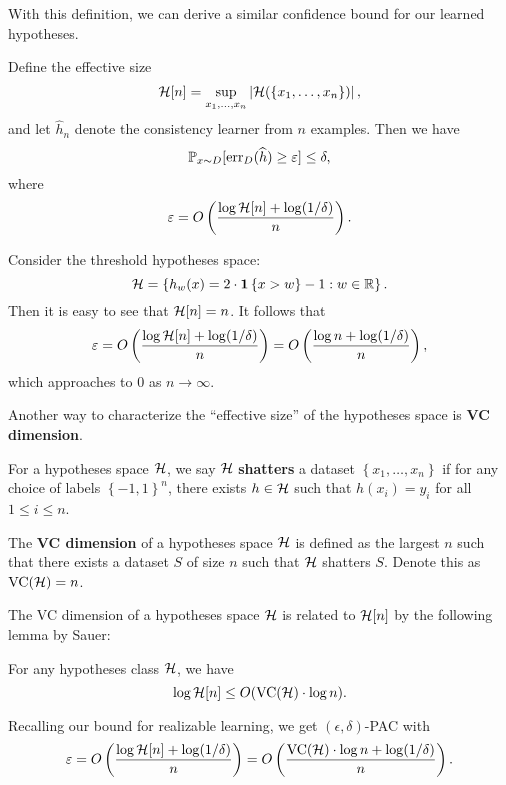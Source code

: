 \documentclass[a4paper]{article}
\begin{document}
With this definition, we can derive a similar confidence
bound for our learned hypotheses.

\begin{thm}
  Define the effective size
  \[
  \mathcal{H} [n] = \sup_{x_1, \dots, x_n}
  \left\lvert \mathcal{H}(\left\{ x_1, \dots, x_n \right\})\right\rvert,
  \]
  and let $\hat{h}_n$ denote the consistency learner
  from $n$ examples. Then we have
  \[
  \mathbb{P}_{x \sim D} [\operatorname{err}_D(\widehat{h}) \geq \varepsilon] \leq \delta,
  \]
  where
  \[
  \varepsilon = O \left(
    \frac{\log \mathcal{H}[n] + \log (1 / \delta)}{n}
   \right).
  \]
\end{thm}

\begin{eg}
  Consider the threshold hypotheses space:
  \[
  \mathcal{H} = \left\{ h_w(x) = 2 \cdot
  \mathbf{1} \left\{ x > w \right\} - 1 : w \in \mathbb{R} \right\}.
  \]
  Then it is easy to see that $\mathcal{H}[n] = n$.
  It follows that
  \[
  \varepsilon = O\left(
    \frac{\log \mathcal{H}[n] + \log (1 / \delta)}{n}
   \right) = O\left(
    \frac{\log n + \log (1 / \delta)}{n}
   \right),
  \]
  which approaches to $0$ as $n \to \infty$.
\end{eg}

Another way to characterize the ``effective size'' of the
hypotheses space is \textbf{VC dimension}.

\begin{defi}[VC dimension]
  For a hypotheses space $\mathcal{H}$, we say
  $\mathcal{H}$ \textbf{shatters} a dataset
  $\left\{ x_1, \dots, x_n \right\}$ if
  for any choice of labels
  $\left\{ -1, 1 \right\}^n$, there exists
  $h \in \mathcal{H}$ such that $h(x_i) = y_i$
  for all $1 \leq i \leq n$.

  The \textbf{VC dimension} of a hypotheses
  space $\mathcal{H}$ is defined
  as the largest $n$ such that there exists a dataset $S$
  of size $n$ such that $\mathcal{H}$ shatters $S$.
  Denote this as $\operatorname{VC}(\mathcal{H}) = n$.
\end{defi}

The VC dimension of a hypotheses space $\mathcal{H}$ is
related to $\mathcal{H}[n]$ by the following lemma by
Sauer:

\begin{thm}
  For any hypotheses class $\mathcal{H}$, we have
  \[
  \log \mathcal{H}[n] \leq O(\operatorname{VC}(\mathcal{H}) \cdot \log n).
  \]
\end{thm}

Recalling our bound for realizable learning, we get
$(\epsilon, \delta)$-PAC with
\[
\varepsilon = O \left( \frac{\log \mathcal{H}[n] + \log (1 / \delta)}{n} \right)
= O \left( \frac{\operatorname{VC}(\mathcal{H}) \cdot \log n + \log (1 / \delta)}{n} \right).
\]
\end{document}
